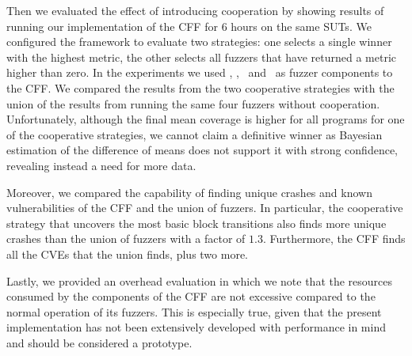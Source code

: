 Then we evaluated the effect of introducing cooperation by showing results of
running our implementation of the \ac{CFF} for 6 hours on the same \acp{SUT}. We
configured the framework to evaluate two strategies: one selects a single winner
with the highest metric, the other selects all fuzzers that have returned a
metric higher than zero. In the experiments we used \aflfast, \fairfuzz,
\honggfuzz\ and \vuzzer\ as fuzzer components to the \ac{CFF}. We compared the
results from the two cooperative strategies with the union of the results from
running the same four fuzzers without cooperation. Unfortunately, although the
final mean coverage is higher for all programs for one of the cooperative
strategies, we cannot claim a definitive winner as Bayesian estimation of the
difference of means does not support it with strong confidence, revealing
instead a need for more data.

Moreover, we compared the capability of finding unique crashes and known
vulnerabilities of the \ac{CFF} and the union of fuzzers. In particular, the
cooperative strategy that uncovers the most basic block transitions also finds
more unique crashes than the union of fuzzers with a factor of $1.3$.
Furthermore, the \ac{CFF} finds all the \acp{CVE} that the union finds, plus two
more.

Lastly, we provided an overhead evaluation in which we note that the resources
consumed by the components of the \ac{CFF} are not excessive compared to the
normal operation of its fuzzers. This is especially true, given that the present
implementation has not been extensively developed with performance in mind and
should be considered a prototype.

